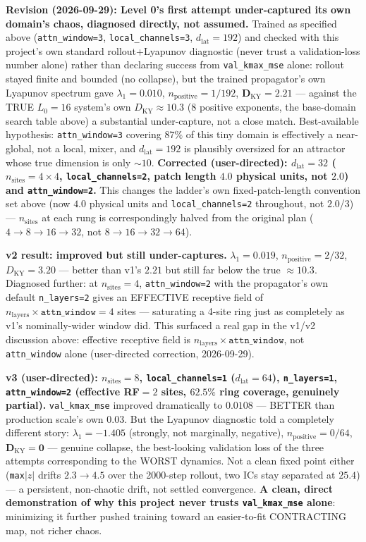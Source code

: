 \documentclass[11pt]{article}
\begin{document}
\textbf{Revision (2026-09-29): Level 0's first attempt under-captured
its own domain's chaos, diagnosed directly, not assumed.} Trained as
specified above (\texttt{attn\_window=3}, \texttt{local\_channels=3},
$d_{\mathrm{lat}}=192$) and checked with this project's own standard
rollout+Lyapunov diagnostic (never trust a validation-loss number alone)
rather than declaring success from \texttt{val\_kmax\_mse} alone:
rollout stayed finite and bounded (no collapse), but the trained
propagator's own Lyapunov spectrum gave $\lambda_1=0.010$,
$n_{\mathrm{positive}}=1/192$, $\boldsymbol{D_{\mathrm{KY}}=2.21}$ ---
against the TRUE $L_0{=}16$ system's own $D_{\mathrm{KY}}\approx10.3$
(8 positive exponents, the base-domain search table above) a
substantial under-capture, not a close match. Best-available hypothesis:
\texttt{attn\_window=3} covering $87\%$ of this tiny domain is
effectively a near-global, not a local, mixer, and $d_{\mathrm{lat}}=192$
is plausibly oversized for an attractor whose true dimension is only
$\sim10$. \textbf{Corrected (user-directed): $d_{\mathrm{lat}}=32$
($n_{\mathrm{sites}}{=}4{\times}4$, \texttt{local\_channels=2}, patch
length $4.0$ physical units, not $2.0$) and \texttt{attn\_window=2}.}
This changes the ladder's own fixed-patch-length convention set above
(now $4.0$ physical units and \texttt{local\_channels=2} throughout, not
$2.0$/3) --- $n_{\mathrm{sites}}$ at each rung is correspondingly halved
from the original plan ($4\to8\to16\to32$, not $8\to16\to32\to64$).

\textbf{v2 result: improved but still under-captures.} $\lambda_1=0.019$,
$n_{\mathrm{positive}}=2/32$, $D_{\mathrm{KY}}=3.20$ --- better than v1's
$2.21$ but still far below the true $\approx10.3$. Diagnosed further: at
$n_{\mathrm{sites}}=4$, \texttt{attn\_window=2} with the propagator's own
default \texttt{n\_layers=2} gives an EFFECTIVE receptive field of
$n_{\mathrm{layers}}\times\texttt{attn\_window}=4$ sites --- saturating
a 4-site ring just as completely as v1's nominally-wider window did.
This surfaced a real gap in the v1/v2 discussion above: effective
receptive field is $n_{\mathrm{layers}}\times\texttt{attn\_window}$, not
\texttt{attn\_window} alone (user-directed correction, 2026-09-29).

\textbf{v3 (user-directed): $n_{\mathrm{sites}}=8$,
\texttt{local\_channels=1} ($d_{\mathrm{lat}}=64$), \texttt{n\_layers=1},
\texttt{attn\_window=2} (effective RF$=2$ sites, $62.5\%$ ring coverage,
genuinely partial).} \texttt{val\_kmax\_mse} improved dramatically to
$\mathbf{0.0108}$ --- BETTER than production scale's own $0.03$. But the
Lyapunov diagnostic told a completely different story:
$\lambda_1=-1.405$ (strongly, not marginally, negative),
$n_{\mathrm{positive}}=0/64$, $\boldsymbol{D_{\mathrm{KY}}=0}$ ---
genuine collapse, the best-looking validation loss of the three attempts
corresponding to the WORST dynamics. Not a clean fixed point either
(\texttt{max}$|z|$ drifts $2.3\to4.5$ over the 2000-step rollout, two ICs
stay separated at $25.4$) --- a persistent, non-chaotic drift, not
settled convergence. \textbf{A clean, direct demonstration of why this
project never trusts \texttt{val\_kmax\_mse} alone}: minimizing it
further pushed training toward an easier-to-fit CONTRACTING map, not
richer chaos.
\end{document}
